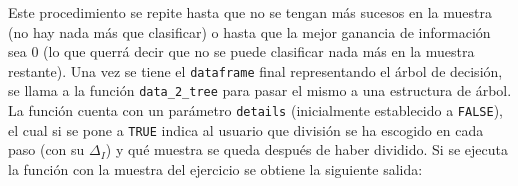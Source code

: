 \documentclass[12pt]{report}\usepackage[]{graphicx}\usepackage[dvipsnames]{xcolor}
\begin{document}
	 			Este procedimiento se repite hasta que no se tengan más sucesos en la muestra (no hay nada más que clasificar) o hasta que la mejor ganancia de información sea 0 (lo que querrá decir que no se puede clasificar nada más en la muestra restante). Una vez se tiene el \texttt{dataframe} final representando el árbol de decisión, se llama a la función \texttt{data\_2\_tree} para pasar el mismo a una estructura de árbol.\\ 
	 			
	 			La función cuenta con un parámetro \texttt{details} (inicialmente establecido a \texttt{FALSE}), el cual si se pone a \texttt{TRUE} indica al usuario que división se ha escogido en cada paso (con su $\Delta_I$) y qué muestra se queda después de haber dividido. Si se ejecuta la función con la muestra del ejercicio se obtiene la siguiente salida:
	 			
\end{document}
